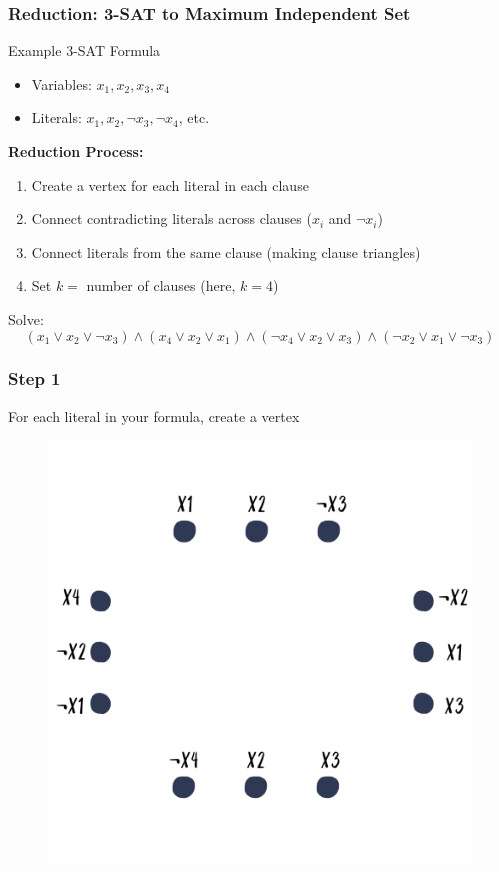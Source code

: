 \documentclass[10pt,aspectratio=43]{beamer}
\begin{document}
\begin{frame}
  \frametitle{Reduction: 3-SAT to Maximum Independent Set}
  
  \begin{block}{Example 3-SAT Formula}
    \begin{itemize}
      \item Variables: $x_1, x_2, x_3, x_4$
      \item Literals: $x_1, x_2, \lnot x_3, \lnot x_4$, etc.
    
    \end{itemize}
  \end{block}
  
  \vspace{0.3cm}
  
  \textbf{Reduction Process:}
  \begin{enumerate}
    \item Create a vertex for each literal in each clause
    \item Connect contradicting literals across clauses ($x_i$ and $\lnot x_i$)
    \item Connect literals from the same clause (making clause triangles)
    \item Set $k =$ number of clauses (here, $k = 4$)
  \end{enumerate}
  
   \begin{block}{Solve: }
      \[
      (x_1 \lor x_2 \lor \lnot x_3) \land
      (x_4 \lor x_2 \lor x_1) \land
      (\lnot x_4 \lor x_2 \lor x_3) \land
      (\lnot x_2 \lor x_1 \lor \lnot x_3)
      \]
  \end{block}
 
\end{frame}
\begin{frame}
  \frametitle{Step 1}

 For each literal in your formula, create a vertex

  \begin{figure}[h!]
    \centering
    \includegraphics[width=0.45\linewidth]{figures/lec/reduction_1.png}
  \end{figure}
\end{frame}
\end{document}
